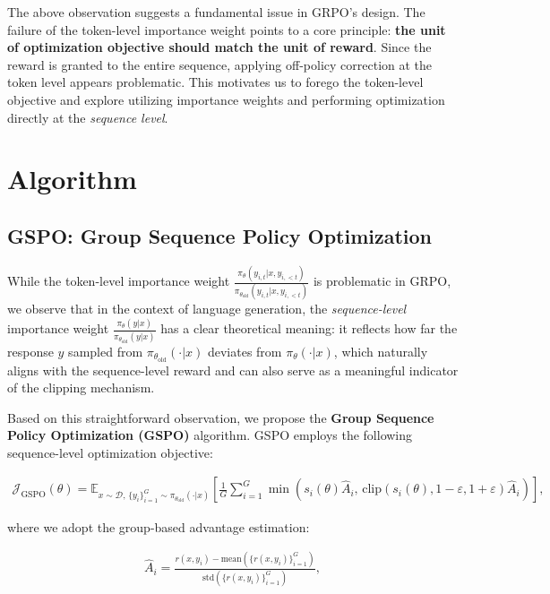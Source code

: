 The above observation suggests a fundamental issue in GRPO's design. The failure of the token-level importance weight points to a core principle: \textbf{the unit of optimization objective should match the unit of reward}. Since the reward is granted to the entire sequence, applying off-policy correction at the token level appears problematic. This motivates us to forego the token-level objective and explore utilizing importance weights and performing optimization directly at the \textit{sequence level}.

\section{Algorithm}

\subsection{GSPO: Group Sequence Policy Optimization}

While the token-level importance weight $\frac{ \pi_{\theta} (y_{i,t} | x, y_{i,<t}) }{ \pi_{\theta_\text{old}} (y_{i,t} | x,y_{i,<t})}$ is problematic in GRPO, we observe that in the context of language generation, the \textit{sequence-level} importance weight $\frac{ \pi_{\theta} (y | x) }{ \pi_{\theta_\text{old}} (y | x)}$ has a clear theoretical meaning: it reflects how far the response $y$ sampled from $\pi_{\theta_\text{old}} (\cdot | x)$ deviates from $\pi_{\theta} (\cdot | x)$, which naturally aligns with the sequence-level reward and can also serve as a meaningful indicator of the clipping mechanism.

Based on this straightforward observation, we propose the \textbf{Group Sequence Policy Optimization (GSPO)} algorithm. GSPO employs the following sequence-level optimization objective:

\begin{align}
\mathcal{J}_\text{GSPO} (\theta) =
\mathbb{E}_{ x \sim \mathcal{D},\, \{y_i\}_{i=1}^G \sim \pi_{\theta_\text{old}}( \cdot | x) }
\left[ 
\frac{1}{G} \sum_{i=1}^{G}
\min \left( s_{i}(\theta)  \widehat{A}_{i},  \, \mathrm{clip} \left( s_{i}(\theta), 1 - {\varepsilon}, 1 + {\varepsilon} \right) \widehat{A}_{i} \right) 
\right],
\label{equ:gspo}
\end{align}

where we adopt the group-based advantage estimation:

\begin{align}
\widehat{A}_{i} = \frac{r(x, y_i) - \mathrm{mean} \left( \{ r(x, y_i) \}_{i=1}^G \right) }{ \mathrm{std} \left( \{ r(x, y_i) \}_{i=1}^G \right) },
\end{align}

